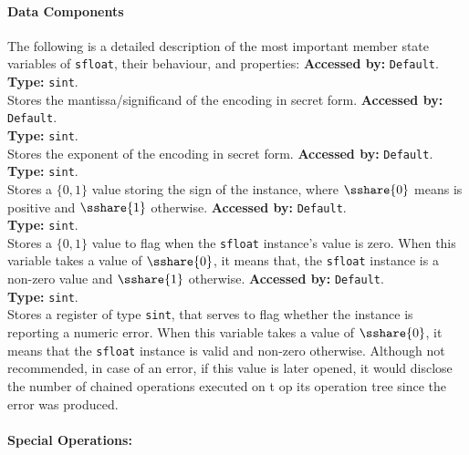 \begin{mylisting}
\paragraph{Data Components}
The following is a detailed description of the most important member state variables of \verb|sfloat|, their behaviour, and properties:		
		\textbf{Accessed by:} \verb|Default|.\\
		\textbf{Type:} \verb|sint|.\\
		Stores the mantissa/significand of the encoding in secret form.
		\textbf{Accessed by:} \verb|Default|.\\
		\textbf{Type:} \verb|sint|.\\
		Stores the exponent of the encoding in secret form.
		\textbf{Accessed by:} \verb|Default|.\\
		\textbf{Type:} \verb|sint|.\\
		Stores a $\{0,1\}$ value storing the sign of the instance, where $\sshare{0}$ means is positive and $\sshare{1}$ otherwise.		
		\textbf{Accessed by:} \verb|Default|.\\
		\textbf{Type:} \verb|sint|.\\
		Stores a $\{0,1\}$ value to flag when the \verb|sfloat| instance's value is zero. 
		When this variable takes a value of $\sshare{0}$, it means that, the \verb|sfloat| instance is a non-zero value and $\sshare{1}$ otherwise.		
		\textbf{Accessed by:} \verb|Default|.\\
		\textbf{Type:} \verb|sint|.\\
		Stores a register of type \verb|sint|, 
		that serves to flag whether the instance is reporting a numeric error. 
		When this variable takes a value of $\sshare{0}$, 
		it means that the \verb|sfloat| instance is valid and non-zero otherwise. 
		Although not recommended, 
		in case of an error, if this value is later opened, 
		it would disclose the number of chained operations executed on t
		op its operation tree since the error was produced.
		
\paragraph{Special Operations:}

		

\end{mylisting}
